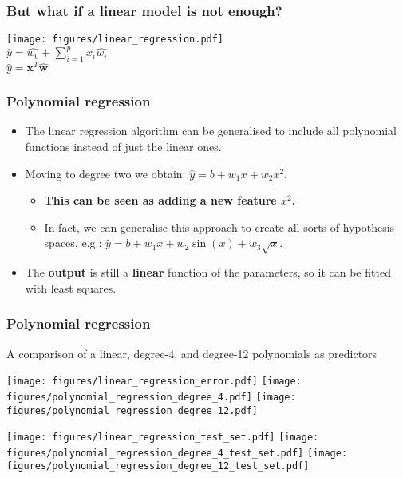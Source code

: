 \documentclass[notes]{beamer}          %
\newcommand{\vect}[1]{\bm{#1}}
\newif\iffull
\begin{document}
\begin{frame}
\frametitle{But what if a linear model is not enough?}
    \begin{center}
            \texttt{[image: figures/linear\_regression.pdf]} \\
            $\hat{y} = \hat{w_0} + \sum_{i=1}^{p} x_i \hat{w_i}$ \\
            $\hat{y} = \vect{x}^T \hat{\vect{w}}$
    \end{center}
\end{frame}

\begin{frame}
\frametitle{Polynomial regression}
    \begin{itemize}
        \item The linear regression algorithm can be generalised to include all polynomial functions instead of just the linear ones.
\iffull
        \item The linear regression model is then just a special case restricted to a polynomial of degree one: $\hat{y} = b + wx$.
\fi
        \item Moving to degree two we obtain: $\hat{y} = b + w_1 x + w_2 x^2$.
        \pause
        \begin{itemize}
            \item \textbf{This can be seen as adding a new feature $x^2$.}
            \item In fact, we can generalise this approach to create all sorts of hypothesis spaces, e.g.: $\hat{y} = b + w_1 x + w_2 \sin{(x)} + w_3 \sqrt{x}$.
        \end{itemize}
        \item The {\bf output} is still a {\bf linear} function of the parameters, so it can be fitted with least squares.
    \end{itemize}
\end{frame}


\begin{frame}
\frametitle{Polynomial regression}
    A comparison of a linear, degree-4, and degree-12 polynomials as predictors
    \begin{center}
        \texttt{[image: figures/linear\_regression\_error.pdf]}
        \texttt{[image: figures/polynomial\_regression\_degree\_4.pdf]}
        \texttt{[image: figures/polynomial\_regression\_degree\_12.pdf]}
    \end{center}
    \pause
    \begin{center}
        \texttt{[image: figures/linear\_regression\_test\_set.pdf]}
        \texttt{[image: figures/polynomial\_regression\_degree\_4\_test\_set.pdf]}
        \texttt{[image: figures/polynomial\_regression\_degree\_12\_test\_set.pdf]}
    \end{center}
\end{frame}
\end{document}
